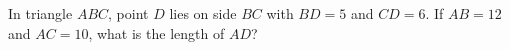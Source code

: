 In triangle $ABC$, point $D$ lies on side $BC$ with $BD=5$ and $CD=6$. If $AB=12$ and $AC=10$, what is the length of $AD$?
